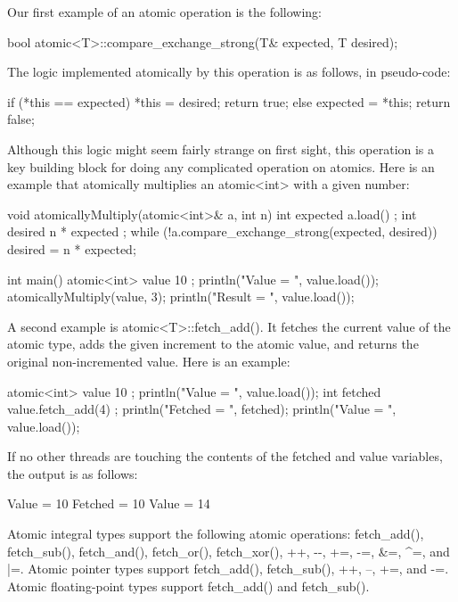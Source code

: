 Our first example of an atomic operation is the following:

\begin{cpp}
bool atomic<T>::compare_exchange_strong(T& expected, T desired);
\end{cpp}

The logic implemented atomically by this operation is as follows, in pseudo-code:

\begin{cpp}
if (*this == expected) {
    *this = desired;
    return true;
} else {
    expected = *this;
    return false;
}
\end{cpp}

Although this logic might seem fairly strange on first sight, this operation is a key building block for doing any complicated operation on atomics. Here is an example that atomically multiplies an atomic<int> with a given number:

\begin{cpp}
void atomicallyMultiply(atomic<int>& a, int n)
{
    int expected { a.load() };
    int desired { n * expected };
    while (!a.compare_exchange_strong(expected, desired)) {
        desired = n * expected;
    }
}

int main()
{
    atomic<int> value { 10 };
    println("Value = {}", value.load());
    atomicallyMultiply(value, 3);
    println("Result = {}", value.load());
}
\end{cpp}

A second example is atomic<T>::fetch\_add(). It fetches the current value of the atomic type, adds the given increment to the atomic value, and returns the original non-incremented value. Here is an example:

\begin{cpp}
atomic<int> value { 10 };
println("Value = {}", value.load());
int fetched { value.fetch_add(4) };
println("Fetched = {}", fetched);
println("Value = {}", value.load());
\end{cpp}

If no other threads are touching the contents of the fetched and value variables, the output is as follows:

\begin{shell}
Value = 10
Fetched = 10
Value = 14
\end{shell}

Atomic integral types support the following atomic operations: fetch\_add(), fetch\_sub(), fetch\_and(), fetch\_or(), fetch\_xor(), ++, -{}-, +=, -=, \&=, \^{}=, and |=. Atomic pointer types support fetch\_add(), fetch\_sub(), ++, --, +=, and -=. Atomic floating-point types support fetch\_add() and fetch\_sub().

